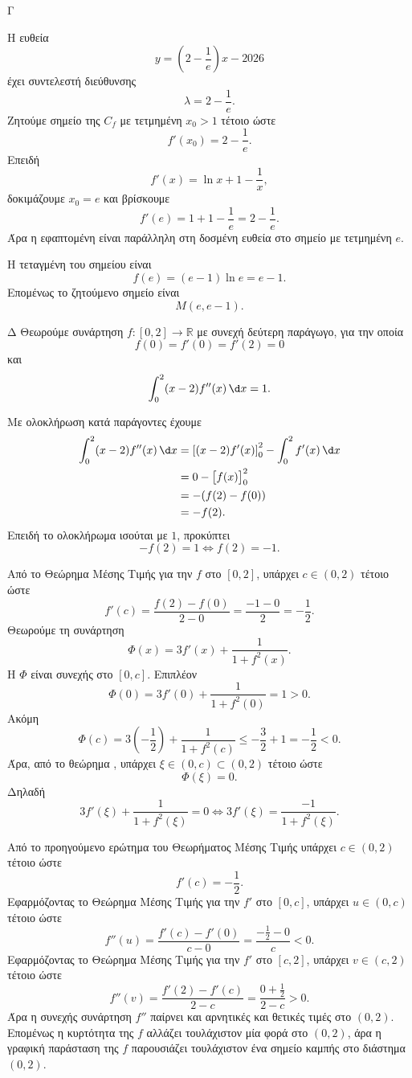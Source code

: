 \begin{thema}{Γ}
\begin{erwthma}
\item Η ευθεία
\[
y=\left(2-\frac{1}{e}\right)x-2026
\]
έχει συντελεστή διεύθυνσης
\[
\lambda=2-\frac{1}{e}.
\]
Ζητούμε σημείο της $C_f$ με τετμημένη $x_0>1$ τέτοιο ώστε
\[
f'(x_0)=2-\frac{1}{e}.
\]
Επειδή
\[
f'(x)=\ln x+1-\frac{1}{x},
\]
δοκιμάζουμε $x_0=e$ και βρίσκουμε
\[
f'(e)=1+1-\frac{1}{e}=2-\frac{1}{e}.
\]
Άρα η εφαπτομένη είναι παράλληλη στη δοσμένη ευθεία στο σημείο με τετμημένη $e$.

Η τεταγμένη του σημείου είναι
\[
f(e)=(e-1)\ln e=e-1.
\]
Επομένως το ζητούμενο σημείο είναι
\[
{M(e,e-1)}.
\]
\end{erwthma}
\end{thema}

\begin{thema}{Δ}
Θεωρούμε συνάρτηση $f:[0,2]\to\mathbb{R}$ με συνεχή δεύτερη παράγωγο, για την οποία
\[
f(0)=f'(0)=f'(2)=0
\]
και
\[
\dint_0^2 (x-2)f''(x)\,\d x=1.
\]
\begin{erwthma}
\item Με ολοκλήρωση κατά παράγοντες έχουμε
\begin{align*}
\dint_0^2 (x-2)f''(x)\,\d x
&=\left[(x-2)f'(x)\right]_0^2-\dint_0^2 f'(x)\,\d x\\
&=0-\bigl[f(x)\bigr]_0^2\\
&=-(f(2)-f(0))\\
&=-f(2).
\end{align*}
Επειδή το ολοκλήρωμα ισούται με $1$, προκύπτει
\[
-f(2)=1
\Leftrightarrow
{f(2)=-1}.
\]

\item Από το Θεώρημα Μέσης Τιμής για την $f$ στο $[0,2]$, υπάρχει $c\in(0,2)$ τέτοιο ώστε
\[
f'(c)=\frac{f(2)-f(0)}{2-0}
=\frac{-1-0}{2}
=-\frac{1}{2}.
\]
Θεωρούμε τη συνάρτηση
\[
\Phi(x)=3f'(x)+\frac{1}{1+f^2(x)}.
\]
Η $\Phi$ είναι συνεχής στο $[0,c]$. Επιπλέον
\[
\Phi(0)=3f'(0)+\frac{1}{1+f^2(0)}=1>0.
\]
Ακόμη
\[
\Phi(c)=3\left(-\frac{1}{2}\right)+\frac{1}{1+f^2(c)}
\leq -\frac{3}{2}+1
=-\frac{1}{2}<0.
\]
Άρα, από το θεώρημα , υπάρχει $\xi\in(0,c)\subset(0,2)$ τέτοιο ώστε
\[
\Phi(\xi)=0.
\]
Δηλαδή
\[
3f'(\xi)+\frac{1}{1+f^2(\xi)}=0
\Leftrightarrow
{3f'(\xi)=\frac{-1}{1+f^2(\xi)}}.
\]

\item Από το προηγούμενο ερώτημα του Θεωρήματος Μέσης Τιμής υπάρχει $c\in(0,2)$ τέτοιο ώστε
\[
f'(c)=-\frac{1}{2}.
\]
Εφαρμόζοντας το Θεώρημα Μέσης Τιμής για την $f'$ στο $[0,c]$, υπάρχει $u\in(0,c)$ τέτοιο ώστε
\[
f''(u)=\frac{f'(c)-f'(0)}{c-0}
=\frac{-\frac{1}{2}-0}{c}<0.
\]
Εφαρμόζοντας το Θεώρημα Μέσης Τιμής για την $f'$ στο $[c,2]$, υπάρχει $v\in(c,2)$ τέτοιο ώστε
\[
f''(v)=\frac{f'(2)-f'(c)}{2-c}
=\frac{0+\frac{1}{2}}{2-c}>0.
\]
Άρα η συνεχής συνάρτηση $f''$ παίρνει και αρνητικές και θετικές τιμές στο $(0,2)$. Επομένως η κυρτότητα της $f$ αλλάζει τουλάχιστον μία φορά στο $(0,2)$, άρα η γραφική παράσταση της $f$ παρουσιάζει τουλάχιστον ένα σημείο καμπής στο διάστημα $(0,2)$.


\end{erwthma}
\end{thema}
